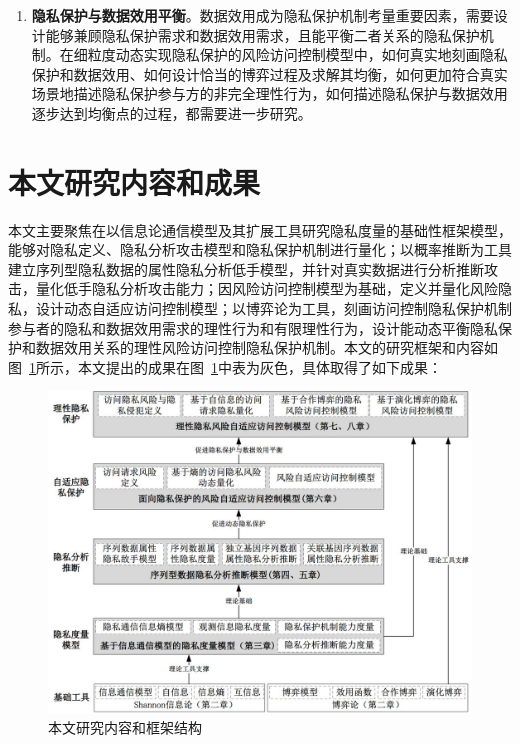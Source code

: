 \begin{enumerate}
	\item \textbf{隐私保护与数据效用平衡}。数据效用成为隐私保护机制考量重要因素，需要设计能够兼顾隐私保护需求和数据效用需求，且能平衡二者关系的隐私保护机制。在细粒度动态实现隐私保护的风险访问控制模型中，如何真实地刻画隐私保护和数据效用、如何设计恰当的博弈过程及求解其均衡，如何更加符合真实场景地描述隐私保护参与方的非完全理性行为，如何描述隐私保护与数据效用逐步达到均衡点的过程，都需要进一步研究。
\end{enumerate}

\section{本文研究内容和成果}

本文主要聚焦在以信息论通信模型及其扩展工具研究隐私度量的基础性框架模型，能够对隐私定义、隐私分析攻击模型和隐私保护机制进行量化；以概率推断为工具建立序列型隐私数据的属性隐私分析低手模型，并针对真实数据进行分析推断攻击，量化低手隐私分析攻击能力；因风险访问控制模型为基础，定义并量化风险隐私，设计动态自适应访问控制模型；以博弈论为工具，刻画访问控制隐私保护机制参与者的隐私和数据效用需求的理性行为和有限理性行为，设计能动态平衡隐私保护和数据效用关系的理性风险访问控制隐私保护机制。本文的研究框架和内容如图~\ref{fig:chapter1-research-framework}所示，本文提出的成果在图~\ref{fig:chapter1-research-framework}中表为灰色，具体取得了如下成果：

\begin{figure}[htbp]
	\centering
	\includegraphics[width = 0.95\linewidth]{./figures/chapter1-research-framework.jpg}
	\caption{本文研究内容和框架结构}
	\label{fig:chapter1-research-framework}
\end{figure}

